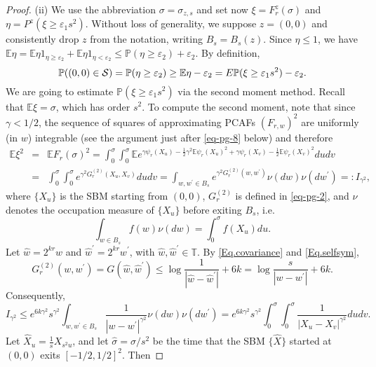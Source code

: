 \documentclass[11pt]{article}
\theoremstyle{definition}
\def \e {\varepsilon}
\def \E {{\mathbb{E}}}
\def \P {{\mathbb{P}}}
\def \T {{\mathbb{T}}}
\def \s {\sigma}
\def \ss {{\cal S}}
\begin{document}
\begin{proof}
(ii) We use the abbreviation $\s = \s_{z,s}$ and set now
$\xi =  F_r^z (\s) $ and  $\eta = P^z (\xi \geq \e_1 s^2)$.
Without loss of generality, we suppose $z = (0, 0)$ and consistently
drop $z$ from the notation, writing $B_s=B_s(z)$.
Since $\eta \le 1$, we have
$\E \eta = \E \eta 1_{\eta \ge \e_2} +
\E \eta 1_{\eta < \e_2} \le \P (\eta \ge \e_2) + \e_2$. By definition,
 \begin{equation} \label{Eq.zisslow}
\P  ((0,0) \in \ss)  = \P (\eta \ge \e_2 ) \ge
\E \eta -  \e_2 = E \P (\xi \ge \e_1 s^2) - \e_2 .
 \end{equation}
We are going to estimate $ \P (\xi \ge \e_1 s^2) $
via the second moment method. Recall
that
$\E \xi = \s $, which has order $s^2$.  To compute the second moment,
note that since $\gamma<1/2$, the sequence of squares of
approximating
PCAFs $(F_{r,w})^2$ are uniformly (in $w$) integrable (see the argument just after
\eqref{eq-pg-8} below)
and therefore
%
 \begin{eqnarray*}
 \E \xi^2
  & = &
\E F_r (\s)^2 = \int_0^\s \int_0^\s \E e^{\gamma \psi_r  (X_u ) - \frac 1 2 \gamma^2 \E \psi_r  (X_u )^2 + \gamma \psi_r  (X_v ) - \frac 1 2 \E \psi_r  (X_v )^2} d u d v
  \\ & = &
\int_0^\s \int_0^\s  e^{\gamma^2 G_r^{(2)} (X_u , X_v  ) }  d u d v=
\int_{w, w^\prime \in B_s } e^{\gamma^2 G_r^{(2)} (w, w^\prime) } \nu (dw) \nu (dw^\prime) = : I_{\gamma^2},
 \end{eqnarray*}
 where $\{ X_u \}$ is the SBM starting from $(0,0)$,
 $G_r^{(2)}$ is defined in
 \eqref{eq-pg-2}, and
 $\nu$
denotes the occupation measure of $\{ X_u \}$ before exiting $B_s$,
i.e.
 $$
\int_{w \in B_s } f(w) \nu (dw) = \int_0^\s f (X_u ) d u .
 $$
Let $\hat w = 2^{kr} w$ and $\hat w^\prime = 2^{kr} w^\prime$,
with $\hat w,\hat w^\prime\in \T$.
By \eqref{Eq.covariance} and \eqref{Eq.selfsym},
$$G_r^{(2)} (w, w^\prime) = G(\hat w, \hat w^\prime) \le \log \frac 1 {|\hat w - \hat w^\prime|} +  6 k = \log \frac s {|w-w^\prime|} + 6k. $$
Consequently,
 $$
I_{\gamma^2} \le e^{6 k \gamma^2} s^{\gamma^2} \int_{w, w^\prime \in B_s} \frac 1 {|w- w^\prime|^{\gamma^2}} \nu (d w) \nu (d w^\prime) = e^{6 k \gamma^2} s^{\gamma^2} \int_0^\s \int_0^\s \frac 1 {|X_u  - X_v  |^{\gamma^2}} d u d v .
 $$
Let $\hat X_u  = \frac 1 s X_{s^2 u} $, and let
$\hat \s = \s / {s^2}$ be the time that the
SBM $\{ \hat X \}$ started at $(0,0)$ exits $[-1/2,1/2]^2$. Then

\end{proof}
\end{document}

